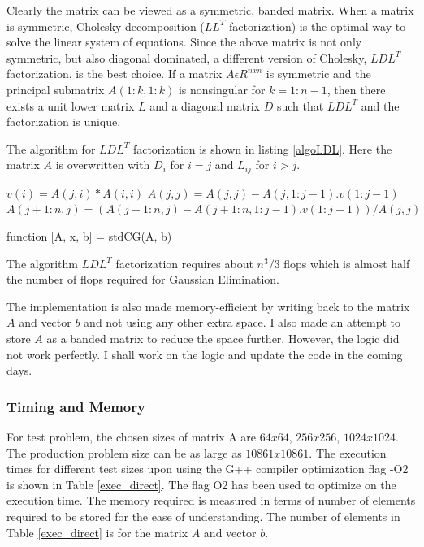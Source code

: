 \documentclass{article}
\begin{document}
\begin{spacing}{1.1}
Clearly the matrix can be viewed as a symmetric, banded matrix. When a matrix is symmetric, Cholesky decomposition ($LL^T$ factorization) is the optimal way to solve the linear system of equations. Since the above matrix is not only symmetric, but also diagonal dominated, a different version of Cholesky, $LDL^T$ factorization, is the best choice. 
If a matrix $A\epsilon R^{nxn}$ is symmetric and the principal submatrix $A(1:k,1:k)$ is nonsingular for $k=1:n-1$, then there exists a unit lower matrix $L$ and a diagonal matrix $D$ such that $LDL^T$ and the factorization is unique. \cite{MatComp}

The algorithm for $LDL^T$ factorization is shown in listing \eqref{algoLDL}. Here the matrix $A$ is overwritten with $D_i$ for $i=j$ and $L_{ij}$ for $i>j$.
\begin{algorithm}[H]

\begin{algorithmic}[1]

\STATE $v(i) = A(j,i)*A(i,i)$ 
\ENDFOR
\STATE $A(j,j) = A(j,j) - A(j,1:j-1).v(1:j-1)$
\STATE $A(j+1:n,j) = (A(j+1:n, j) - A(j+1:n,1:j-1).v(1:j-1))/A(j,j) $ 
\ENDFOR
\end{algorithmic}
\caption{\label{algoLDL} function [A, x, b] = stdCG(A, b)} 
\end{algorithm}

The algorithm $LDL^T$ factorization requires about $n^3/3$ flops which is almost half the number of flops required for Gaussian Elimination. 

The implementation is also made memory-efficient by writing back to the matrix $A$ and vector $b$ and not using any other extra space. I also made an attempt to store $A$ as a banded matrix to reduce the space further. However, the logic did not work perfectly. I shall work on the logic and update the code in the coming days.

\subsubsection*{Timing and Memory}
For test problem, the chosen sizes of matrix A are $64x64$, $256x256$, $1024x1024$. The production problem size can be as large as $10861x10861$. 
The execution times for different test sizes upon using the G++ compiler optimization flag -O2 is shown in Table \ref{exec_direct}. The flag O2 has been used to optimize on the execution time.
The memory required is measured in terms of number of elements required to be stored for the ease of understanding. The number of elements in Table \ref{exec_direct} is for the matrix $A$ and vector $b$. 


\end{spacing}
\end{document}
